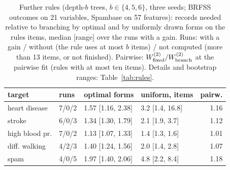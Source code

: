 \begin{table}[t]
\centering
\caption{Further rules (depth-$b$ trees, $b\in\{4,5,6\}$, three seeds; BRFSS outcomes on 21 variables, Spambase on 57 features): records needed relative to branching by optimal and by uniformly drawn forms on the rule\textquotesingle s items, median [range] over the runs with a gain. Runs: with a gain / without (the rule uses at most $b$ items) / not computed (more than 13 items, or not finished). Pairwise: $W^{(2)}_{\rm fixed}/W^{(2)}_{\rm branch}$ at the pairwise fit (rules with at most ten items). Details and bootstrap ranges: Table~\ref{tab:rules}.}
\label{tab:rulesmain}
\footnotesize
\setlength{\tabcolsep}{2pt}
\begin{tabular}{llllr}
\toprule
target & runs & optimal forms & uniform, items & pairw. \\
\midrule
heart disease & 7/0/2 & 1.57 [1.16, 2.38] & 3.2 [1.4, 16.8] & 1.16 \\
stroke & 6/0/3 & 1.34 [1.30, 1.79] & 2.1 [1.9, 3.7] & 1.12 \\
high blood pr. & 7/0/2 & 1.13 [1.07, 1.33] & 1.4 [1.3, 1.6] & 1.01 \\
diff. walking & 4/2/3 & 1.40 [1.24, 1.56] & 2.0 [1.4, 2.8] & 1.07 \\
spam & 4/0/5 & 1.97 [1.40, 2.06] & 4.8 [2.2, 8.4] & 1.18 \\
\bottomrule
\end{tabular}
\end{table}
